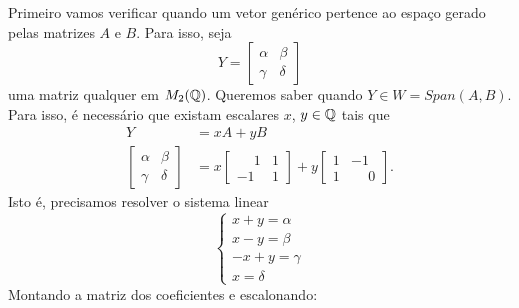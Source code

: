 \documentclass[12pt]{exam}
\begin{document}
    \solucao
    Primeiro vamos verificar quando um vetor genérico pertence ao espaço gerado pelas matrizes $A$ e $B$. Para isso, seja
    \[
        Y = \begin{bmatrix}
            \alpha & \beta\\
            \gamma & \delta
        \end{bmatrix}
    \]
    uma matriz qualquer em $M_2(\mathbb{Q})$. Queremos saber quando $Y \in W = Span(A, B)$. Para isso, é necessário que existam escalares $x$, $y \in \mathbb{Q}$ tais que
    \begin{align*}
        Y &= xA + yB\\
        \begin{bmatrix}\alpha & \beta\\\gamma & \delta\end{bmatrix} &= x\begin{bmatrix}\phantom{-} 1 & 1\\-1 & 1\end{bmatrix} + y\begin{bmatrix}1 & -1\\1 & \phantom{-} 0\end{bmatrix}.
    \end{align*}
    Isto é, precisamos resolver o sistema linear
    \[
        \begin{cases}
            x + y = \alpha\\
            x - y = \beta\\
            -x + y = \gamma\\
            x = \delta
        \end{cases}
    \]
    Montando a matriz dos coeficientes e escalonando:
\end{document}
